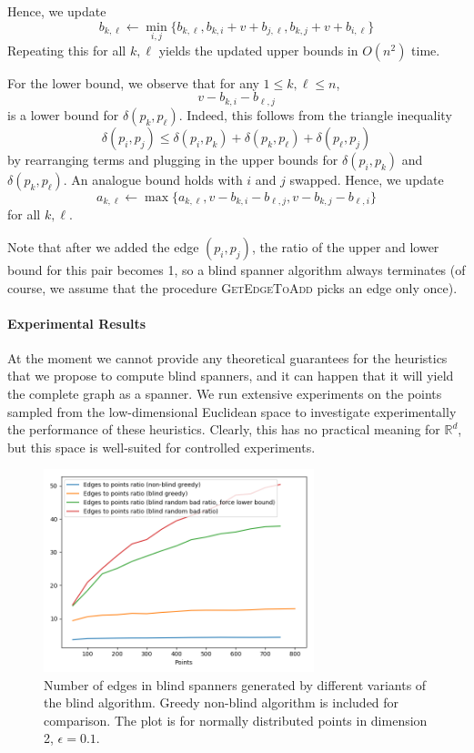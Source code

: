 \documentclass[a4paper,USenglish]{socg-lipics-v2018}
\newcommand{\R}{\mathbb{R}}
\newcommand{\eps}{\epsilon}
\newcommand{\dist}{\delta}
\begin{document}
Hence, we update
\[
    b_{k,\ell}\gets \min_{i,j}\{b_{k,\ell},b_{k,i}+v+b_{j,\ell},b_{k,j}+v+b_{i,\ell}\}
\]
Repeating this for all $k,\ell$ yields the updated upper bounds in $O(n^2)$
time.

For the lower bound, we observe that for any $1\leq k,\ell\leq n$,
\[
    v-b_{k,i}-b_{\ell,j}
\]
is a lower bound for $\dist(p_k,p_\ell)$. Indeed, this follows from
the triangle inequality
%
\[\dist(p_i,p_j)\leq \dist(p_i,p_k)+\dist(p_k,p_\ell)+\dist(p_\ell,p_j)\]
by rearranging terms and plugging in the upper bounds for $\dist(p_i,p_k)$
and $\dist(p_k,p_\ell)$. An analogue bound holds with $i$ and $j$ swapped. Hence, we update
%
\[a_{k,\ell}\gets \max\{a_{k,\ell},v-b_{k,i}-b_{\ell,j},v-b_{k,j}-b_{\ell,i}\}\]
%
for all $k,\ell$.

Note that after we added the edge $(p_i, p_j)$, the ratio of the upper and lower bound
for this pair becomes 1, so a blind spanner algorithm always terminates (of course,
we assume that the procedure \textsc{GetEdgeToAdd} picks an edge only once).


\paragraph{Experimental Results}
At the moment we cannot provide any theoretical guarantees for the heuristics that we propose to compute blind spanners,
and it can happen that it will yield the complete graph as a spanner.
We run extensive experiments on the points sampled from the low-dimensional Euclidean space to investigate
experimentally the performance of these heuristics. Clearly, this has no practical meaning for $\R^d$, but
this space is well-suited for controlled experiments.

\begin{figure}[ht]
    \label{fig:spanner-sparseness}
    \includegraphics[width=0.7\textwidth]{edges_to_points_ratio_dim_2_normal_points.png}
    \caption{Number of edges in blind spanners generated by different variants of the blind
    algorithm. Greedy non-blind algorithm is included for comparison. The plot is for normally distributed points
    in dimension 2, $\eps = 0.1$.}
\end{figure}
\end{document}
